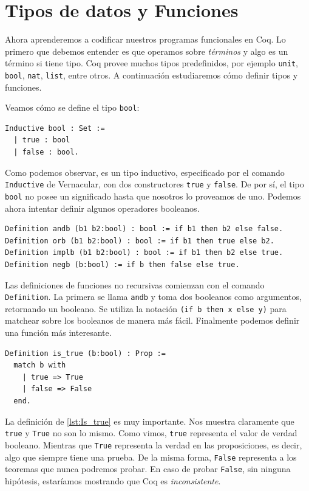 \section{Tipos de datos y Funciones}

Ahora aprenderemos a codificar nuestros programas funcionales en Coq. Lo primero que debemos entender es que operamos sobre \textit{términos} y algo es un término si tiene tipo. Coq provee muchos tipos predefinidos, por ejemplo \lstinline{unit}, \lstinline{bool}, \lstinline{nat}, \lstinline{list}, entre otros. A continuación estudiaremos cómo definir tipos y funciones.

Veamos cómo se define el tipo \lstinline{bool}:

\begin{lstlisting}
Inductive bool : Set :=
  | true : bool
  | false : bool.
\end{lstlisting}

Como podemos observar, es un tipo inductivo, especificado por el comando \lstinline{Inductive} de Vernacular, con dos constructores \lstinline{true} y \lstinline{false}. De por sí, el tipo \lstinline{bool} no posee un significado hasta que nosotros lo proveamos de uno. Podemos ahora intentar definir algunos operadores booleanos.
\begin{lstlisting}
Definition andb (b1 b2:bool) : bool := if b1 then b2 else false.
Definition orb (b1 b2:bool) : bool := if b1 then true else b2.
Definition implb (b1 b2:bool) : bool := if b1 then b2 else true.
Definition negb (b:bool) := if b then false else true.
\end{lstlisting}

Las definiciones de funciones no recursivas comienzan con el comando \lstinline{Definition}. La primera se llama \lstinline{andb} y toma dos booleanos como argumentos, retornando un booleano. Se utiliza la notación \lstinline{(if b then x else y)} para matchear sobre los booleanos de manera más fácil. Finalmente podemos definir una función más interesante.

\begin{lstlisting}[frame=tb,caption={Definición de \lstinline{is_true}},label=lst:Is_true]
Definition is_true (b:bool) : Prop :=
  match b with
    | true => True
    | false => False
  end.
\end{lstlisting}

La definición de \ref{lst:Is_true} es muy importante. Nos muestra claramente que \lstinline{true} y \lstinline{True} no son lo mismo. Como vimos, \lstinline{true} representa el valor de verdad booleano. Mientras que \lstinline{True} representa la verdad en las proposiciones, es decir, algo que siempre tiene una prueba. De la misma forma, \lstinline{False} representa a los teoremas que nunca podremos probar. En caso de probar \lstinline{False}, sin ninguna hipótesis, estaríamos mostrando que Coq es \emph{inconsistente}.

